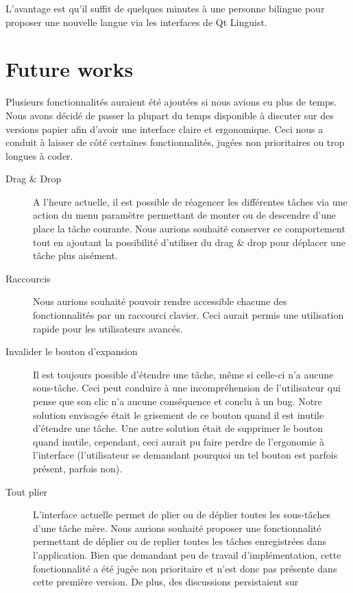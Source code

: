 \documentclass[11pt]{article}
\begin{document}
L'avantage est qu'il suffit de quelques minutes à une personne
bilingue pour proposer une nouvelle langue via les interfaces de Qt
Linguist.


\section{Future works}
\label{sec:futureWorks}

Plusieurs fonctionnalités auraient été ajoutées si nous avions eu plus
de temps. Nous avons décidé de passer la plupart du temps disponible à
discuter sur des versions papier afin d'avoir une interface claire et
ergonomique. Ceci nous a conduit à laisser de côté certaines
fonctionnalités, jugées non prioritaires ou trop longues à
coder.

\begin{description}
\item[Drag \& Drop] A l'heure actuelle, il est possible de réagencer
  les différentes tâches via une action du menu paramètre permettant
  de monter ou de descendre d'une place la tâche courante. Nous
  aurions souhaité conserver ce comportement tout en ajoutant la
  possibilité d'utiliser du drag \& drop pour déplacer une tâche plus
  aisément.
\item[Raccourcis] Nous aurions souhaité pouvoir rendre accessible
  chacune des fonctionnalités par un raccourci clavier. Ceci aurait
  permis une utilisation rapide pour les utilisateurs avancés.
\item[Invalider le bouton d'expansion] Il est toujours possible
  d'étendre une tâche, même si celle-ci n'a aucune sous-tâche. Ceci
  peut conduire à une incompréhension de l'utilisateur qui pense que
  son clic n'a aucune conséquence et conclu à un bug. Notre solution
  envisagée était le grisement de ce bouton quand il est inutile
  d'étendre une tâche. Une autre solution était de supprimer le bouton
  quand inutile, cependant, ceci aurait pu faire perdre de l'ergonomie
  à l'interface (l'utilisateur se demandant pourquoi un tel bouton est
  parfois présent, parfois non).
\item[Tout plier] L'interface actuelle permet de plier ou de déplier
  toutes les sous-tâches d'une tâche mère. Nous aurions souhaité
  proposer une fonctionnalité permettant de déplier ou de replier
  toutes les tâches enregistrées dans l'application. Bien que
  demandant peu de travail d'implémentation, cette fonctionnalité a
  été jugée non prioritaire et n'est donc pas présente dans cette
  première version. De plus, des discussions persistaient sur

\end{description}
\end{document}
